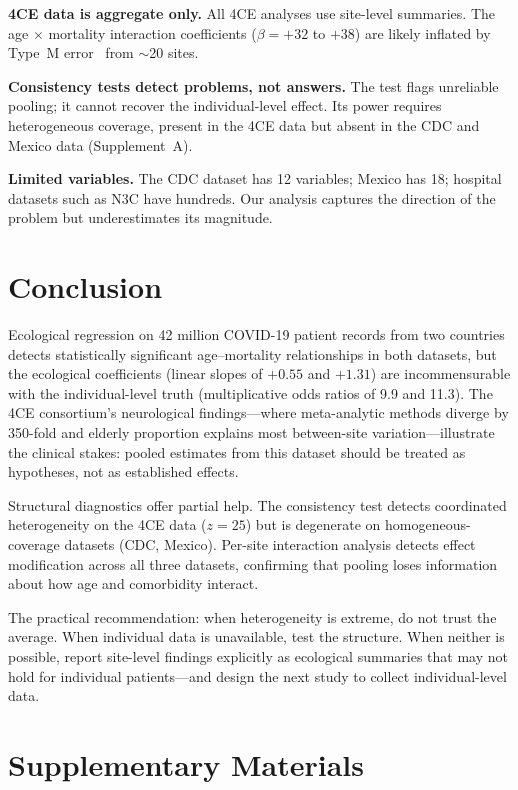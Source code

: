 \documentclass[11pt]{article}
\begin{document}
\textbf{4CE data is aggregate only.}  All 4CE analyses use site-level
summaries.  The age $\times$ mortality interaction coefficients
($\beta = +32$ to $+38$) are likely inflated by Type~M
error~\cite{gelman2014typeMS} from $\sim$20 sites.

\textbf{Consistency tests detect problems, not answers.}  The test flags
unreliable pooling; it cannot recover the individual-level effect.
Its power requires heterogeneous coverage, present in the 4CE data but
absent in the CDC and Mexico data (Supplement~A).

\textbf{Limited variables.}  The CDC dataset has 12 variables; Mexico has
18; hospital datasets such as N3C have hundreds.  Our analysis captures
the direction of the problem but underestimates its magnitude.


\section{Conclusion}

Ecological regression on 42 million COVID-19 patient records from two
countries detects statistically significant age--mortality relationships in
both datasets, but the ecological coefficients (linear slopes of $+0.55$
and $+1.31$) are incommensurable with the individual-level truth
(multiplicative odds ratios of 9.9 and 11.3).  The 4CE consortium's
neurological findings---where meta-analytic methods diverge by 350-fold
and elderly proportion explains most between-site variation---illustrate
the clinical stakes: pooled estimates from this dataset should be treated
as hypotheses, not as established effects.

Structural diagnostics offer partial help.  The consistency test detects
coordinated heterogeneity on the 4CE data ($z = 25$) but is degenerate on
homogeneous-coverage datasets (CDC, Mexico).  Per-site interaction analysis
detects effect modification across all three datasets, confirming that
pooling loses information about how age and comorbidity interact.

The practical recommendation: when heterogeneity is extreme, do not trust the
average.  When individual data is unavailable, test the structure.  When
neither is possible, report site-level findings explicitly as ecological
summaries that may not hold for individual patients---and design the next
study to collect individual-level data.


\appendix

\section{Supplementary Materials}
\label{app:supplementary}
\end{document}
